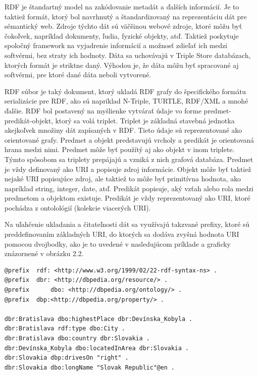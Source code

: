 \documentclass[12pt, a4paper, oneside]{book}
\begin{document}
RDF \cite{rdf} je štandartný model na zakódovanie metadát a ďalších informácií. Je to taktiež formát, ktorý bol navrhnutý a štandardizovaný na reprezentáciu dát pre sémantický web. Zdroje týchto dát sú väčšinou webové zdroje, ktoré môžu byť čokoľvek, napríklad dokumenty, ľudia, fyzické objekty, atď. Taktiež poskytuje spoločný framework na vyjadrenie informácií a možnosť zdieľať ich medzi softvérmi, bez straty ich hodnoty. Dáta sa uchovávajú v Triple Store databázach, ktorých formát je striktne daný. Výhodou je, že dáta môžu byť spracované aj softvérmi, pre ktoré dané dáta neboli vytvorené.




RDF súbor je taký dokument, ktorý ukladá RDF grafy do špecifického formátu serializácie pre RDF, ako sú napríklad N-Triple, TURTLE, RDF/XML a mnohé ďalšie. RDF bol postavený na myšlienke vytvárať údaje vo forme predmet-predikát-objekt, ktorý sa volá triplet. Triplet je základná stavebná jednotka akejkoľvek množiny dát zapísaných v RDF. Tieto údaje sú reprezentované ako orientované grafy. Predmet a objekt predstavujú vrcholy a predikát je orientovaná hrana medzi nimi. Predmet môže byť použítý aj ako objekt v inom triplete. Týmto spôsobom sa triplety prepájajú a vzniká z nich grafová databáza. Predmet je vždy definovaný ako URI a popisuje zdroj informácie. Objekt môže byť taktiež nejaké URI popisujúce zdroj, ale taktiež to môže byť primitívna hodnota, ako napríklad string, integer, date, atď. Predikát popisuje, aký vzťah alebo rola medzi predmetom a objektom existuje. Predikát je vždy reprezentovaný ako URI, ktoré pochádza z ontolológií (kolekcie viacerých URI).


Na uľahčenie ukladania a čitateľnosti dát sa využívajú takzvané prefixy, ktoré sú preddefinovaním základných URI, do ktorých sa dodáva zvyšná hodnota URI pomocou dvojbodky, ako je to uvedené v nasledujúcom príklade a graficky znázornené v obrázku 2.2.
\begin{verbatim}
@prefix  rdf: <http://www.w3.org/1999/02/22-rdf-syntax-ns> .
@prefix	 dbr: <http://dbpedia.org/resource/> .
@prefix 	 dbo: <http://dbpedia.org/ontology/> .
@prefix  dbp:<http://dbpedia.org/property/> .

dbr:Bratislava dbo:highestPlace dbr:Devínska_Kobyla .
dbr:Bratislava rdf:type dbo:City .
dbr:Bratislava dbo:country dbr:Slovakia .
dbr:Devínska_Kobyla dbo:locatedInArea dbr:Slovakia .
dbr:Slovakia dbp:drivesOn "right" .
dbr:Slovakia dbo:longName "Slovak Republic"@en .
\end{verbatim}
\end{document}
